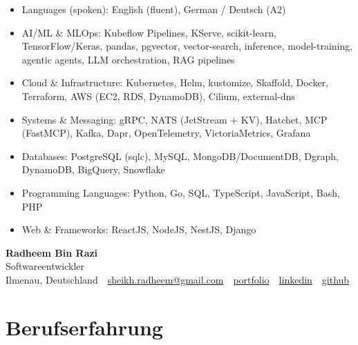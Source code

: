 \documentclass[10pt,a4paper]{resume}
\makeatletter
\newcommand{\Portfolio}{https://radheem.github.io/my-cv}
\newcommand{\PortfolioText}{portfolio}
\newcommand{\GitHub}{https://github.com/radheem}
\newcommand{\LinkedIn}{https://www.linkedin.com/in/radheem-razi}
\newcommand{\Email}{sheikh.radheem@gmail.com}
\makeatother
\begin{document}
\begin{itemize}[leftmargin=1.4em,nosep,topsep=2pt]
  \item Languages (spoken): English (fluent), German / Deutsch (A2)
  \item AI/ML \& MLOps: Kubeflow Pipelines, KServe, scikit-learn, TensorFlow/Keras, pandas, pgvector, vector-search, inference, model-training, agentic agents, LLM orchestration, RAG pipelines
  \item Cloud \& Infrastructure: Kubernetes, Helm, kustomize, Skaffold, Docker, Terraform, AWS (EC2, RDS, DynamoDB), Cilium, external-dns
  \item Systems \& Messaging: gRPC, NATS (JetStream + KV), Hatchet, MCP (FastMCP), Kafka, Dapr, OpenTelemetry, VictoriaMetrics, Grafana
  \item Databases: PostgreSQL (sqlc), MySQL, MongoDB/DocumentDB, Dgraph, DynamoDB, BigQuery, Snowflake
  \item Programming Languages: Python, Go, SQL, TypeScript, JavaScript, Bash, PHP
  \item Web \& Frameworks: ReactJS, NodeJS, NestJS, Django
\end{itemize}

\clearpage
{}

\begin{center}
  {\huge\bfseries Radheem Bin Razi}\\[3pt]
  {\large Softwareentwickler}\\[6pt]
  \small
  Ilmenau, Deutschland \,\textbar\,
  \href{mailto:\Email}{\Email} \,\textbar\,
  \href{\Portfolio}{\PortfolioText} \,\textbar\,
  \href{\LinkedIn}{linkedin} \,\textbar\,
  \href{\GitHub}{github}
\end{center}
\vspace{2pt}

\section{Berufserfahrung}
\end{document}
